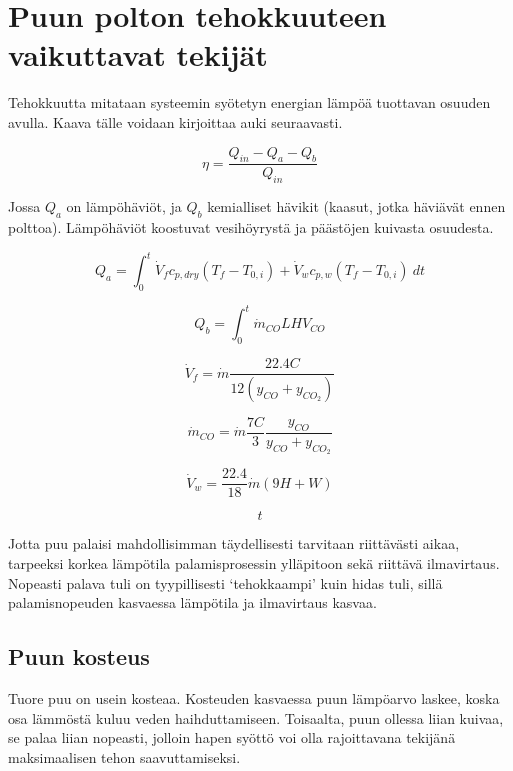 \section{Puun polton tehokkuuteen vaikuttavat tekijät}

Tehokkuutta mitataan systeemin syötetyn energian lämpöä tuottavan osuuden avulla.
Kaava tälle voidaan kirjoittaa auki seuraavasti.

\begin{equation}
	\eta=\frac{Q_{in}-Q_a-Q_b}{Q_{in}}
\end{equation}

\noindent
Jossa \(Q_a\) on lämpöhäviöt, ja \(Q_b\) kemialliset hävikit (kaasut, jotka häviävät ennen polttoa).
Lämpöhäviöt koostuvat vesihöyrystä ja päästöjen kuivasta osuudesta.

\begin{equation}
	Q_a=\int_0^t{
		\dot V_f c_{p,dry}(T_f-T_{0,i}) +
		\dot V_w c_{p,w}(T_f-T_{0,i})
	}\ dt
\end{equation}

\begin{equation}
	Q_b=\int_0^t{
		\dot m_{CO}LHV_{CO}
	}
\end{equation}

\begin{equation}
	\label{eq:savu_virtaama}
	\dot V_f = \dot m \frac{22.4C}{12(y_{CO} + y_{CO_2})}
\end{equation}

\begin{equation}
	\label{eq:co_massavirta}
	\dot m_{CO} = \dot m \frac{7C}{3} \frac{y_{CO}}{y_{CO} + y_{CO_2}}
\end{equation}

\begin{equation}
	\label{eq:vesihoyry}
	\dot V_w = \frac{22.4}{18} \dot m (9H + W)
\end{equation}

\begin{equation}
	t
\end{equation}

Jotta puu palaisi mahdollisimman täydellisesti tarvitaan riittävästi aikaa,
tarpeeksi korkea lämpötila palamisprosessin ylläpitoon sekä riittävä ilmavirtaus.
Nopeasti palava tuli on tyypillisesti `tehokkaampi' kuin hidas tuli, sillä palamisnopeuden
kasvaessa lämpötila ja ilmavirtaus kasvaa.

\subsection{Puun kosteus}
Tuore puu on usein kosteaa. Kosteuden kasvaessa puun lämpöarvo laskee,
koska osa lämmöstä kuluu veden haihduttamiseen.
Toisaalta, puun ollessa liian kuivaa, se palaa liian nopeasti,
jolloin hapen syöttö voi olla rajoittavana tekijänä maksimaalisen tehon saavuttamiseksi.

